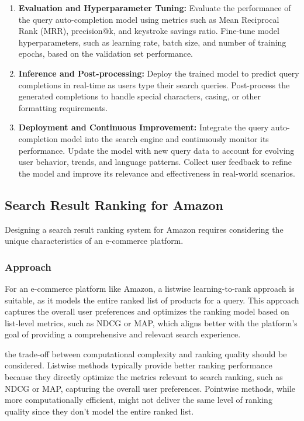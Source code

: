 \documentclass[12pt]{article}
\begin{document}
\begin{enumerate}
\item \textbf{Evaluation and Hyperparameter Tuning:} Evaluate the performance of the query auto-completion model using metrics such as Mean Reciprocal Rank (MRR), precision@k, and keystroke savings ratio. Fine-tune model hyperparameters, such as learning rate, batch size, and number of training epochs, based on the validation set performance.

\item \textbf{Inference and Post-processing:} Deploy the trained model to predict query completions in real-time as users type their search queries. Post-process the generated completions to handle special characters, casing, or other formatting requirements.

\item \textbf{Deployment and Continuous Improvement:} Integrate the query auto-completion model into the search engine and continuously monitor its performance. Update the model with new query data to account for evolving user behavior, trends, and language patterns. Collect user feedback to refine the model and improve its relevance and effectiveness in real-world scenarios.

\end{enumerate}

\subsection{Search Result Ranking for Amazon}

Designing a search result ranking system for Amazon requires considering the unique characteristics of an e-commerce platform.

\subsubsection{Approach}
For an e-commerce platform like Amazon, a listwise learning-to-rank approach is suitable, as it models the entire ranked list of products for a query. This approach captures the overall user preferences and optimizes the ranking model based on list-level metrics, such as NDCG or MAP, which aligns better with the platform's goal of providing a comprehensive and relevant search experience.

the trade-off between computational complexity and ranking quality should be considered. Listwise methods typically provide better ranking performance because they directly optimize the metrics relevant to search ranking, such as NDCG or MAP, capturing the overall user preferences. Pointwise methods, while more computationally efficient, might not deliver the same level of ranking quality since they don't model the entire ranked list.
\end{document}
